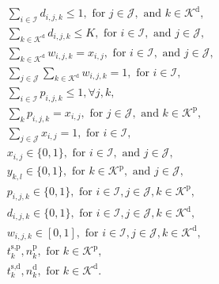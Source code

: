 \begin{align}
\begin{split}
    \end{split} \\
    \label{cst:d_def_1}
    & \sum_{i\in \mathcal{I}} d_{i,j,k} \leq 1, \text{ for }j \in \mathcal{J}, \text{ and } k \in \mathcal{K}^\text{d}, \\
    \label{cst:d_def_2}
    & \sum_{k \in \mathcal{K}^\text{d}} d_{i,j,k} \leq K, \text{ for }i \in \mathcal{I}, \text{ and }j \in \mathcal{J}, \\
    \label{cst:w_def_1}
    & \sum_{k \in \mathcal{K}^\text{d}} w_{i,j,k} = x_{i,j}, \text{ for }i \in \mathcal{I}, \text{ and }j \in \mathcal{J}, \\
    \label{cst:w_def_2}
    & \sum_{j\in \mathcal{J}} \sum_{k \in \mathcal{K}^\text{d}} w_{i,j,k} = 1, \text{ for }i \in \mathcal{I}, \\
    \label{cst:p_def_1}
    & \sum_{i \in \mathcal{I}} p_{i,j,k} \leq 1, \forall j, k, \\
    \label{cst:p_def_2}
    & \sum_k p_{i,j,k} = x_{i,j}, \text{ for }j \in \mathcal{J}, \text{ and } k \in \mathcal{K}^\text{p}, \\
    \label{cst:loc_def}
    & \sum_{j \in \mathcal{J}} x_{i,j} = 1, \text{ for }i \in \mathcal{I}, \\
    \label{cst:var_def_start}
    & x_{i,j} \in \{0,1\}, \text{ for }i \in \mathcal{I}, \text{ and } j \in \mathcal{J}, \\
    & y_{k,l} \in \{0,1\}, \text{ for }k \in \mathcal{K}^\text{p}, \text{ and } j \in \mathcal{J}, \\
    & p_{i,j,k} \in \{0,1\}, \text{ for }i \in \mathcal{I}, j \in \mathcal{J}, k \in \mathcal{K}^\text{p}, \\
    & d_{i,j,k} \in \{0,1\}, \text{ for }i \in \mathcal{I}, j \in \mathcal{J}, k \in \mathcal{K}^\text{d}, \\
    & w_{i,j,k} \in [0,1], \text{ for }i \in \mathcal{I}, j \in \mathcal{J}, k \in \mathcal{K}^\text{d}, \\
    & t^\text{s,p}_{k}, n^\text{p}_{k}, \text{ for }k \in \mathcal{K}^\text{p},\\
    \label{cst:var_def_end}
    & t^\text{s,d}_{k}, n^\text{d}_{k}, \text{ for }k \in \mathcal{K}^\text{d}.
\end{align}
